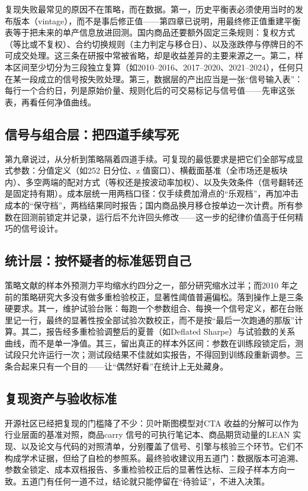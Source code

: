 \documentclass[12pt,a4paper]{ctexart}
\begin{document}
复现失败最常见的原因不在策略，而在数据。第一，历史平衡表必须使用当时的发布版本（vintage），而不是事后修正值——第四章已说明，用最终修正值重建平衡表等于把未来的单产信息放进回测\cite{62}。国内商品还要额外固定三条规则：复权方式（等比或不复权）、合约切换规则（主力判定与移仓日）、以及涨跌停与停牌日的不可成交处理。这三条在研报中常被省略，却是收益差异的主要来源之一。第二，样本区间至少切分为三段独立复算（如2010--2016、2017--2020、2021--2024），任何只在某一段成立的信号按失败处理。第三，数据层的产出应当是一张“信号输入表”：每行一个合约日，列是原始价量、规则化后的可交易标记与信号值——先审这张表，再看任何净值曲线。

\subsection{信号与组合层：把四道手续写死}

第九章说过，从分析到策略隔着四道手续。可复现的最低要求是把它们全部写成显式参数：分值定义（如252 日分位、z 值窗口）、横截面基准（全市场还是板块内）、多空两端的配对方式（等权还是按波动率加权）、以及失效条件（信号翻转还是固定持有期）。成本层统一用两档口径：仅手续费加滑点的“乐观档”，再加冲击成本的“保守档”，两档结果同时报告；国内商品换月移仓按单边一次计费。所有参数在回测前锁定并记录，运行后不允许回头修改——这一步的纪律价值高于任何精巧的信号设计。

\subsection{统计层：按怀疑者的标准惩罚自己}

策略文献的样本外预测力平均缩水约四分之一，部分研究缩水过半\cite{101}；而2010 年之前的策略研究大多没有做多重检验校正，显著性阈值普遍偏松\cite{98}。落到操作上是三条硬要求。其一，维护试验台账：每跑一个参数组合、每换一个信号定义，都在台账里记一行，最终的显著性按全部试验次数校正，而不是按“最后一次跑通的那版”计算。其二，报告经多重检验调整后的夏普（如Deflated Sharpe）与试验数的关系曲线，而不是单一净值\cite{97}。其三，留出真正的样本外区间：参数在训练段锁定后，测试段只允许运行一次；测试段结果不佳就如实报告，不得回到训练段重新调参。三条合起来只有一个目的——让“偶然好看”在统计上无处藏身。

\subsection{复现资产与验收标准}

开源社区已经把复现的门槛降了不少：贝叶斯图模型对CTA 收益的分解可以作为行业层面的基准对照\cite{93}，商品carry 信号的可执行笔记本、商品期货动量的LEAN 实现、以及论文与代码的对照清单，分别覆盖了信号、引擎与核验三个环节\cite{94, 95, 96}。它们不构成学术证据，但给了自检的参照系。最终验收建议用五道门：数据版本可追溯、参数全锁定、成本双档报告、多重检验校正后的显著性达标、三段子样本方向一致。五道门有任何一道不过，结论就只能停留在“待验证”，不进入决策。
\end{document}
